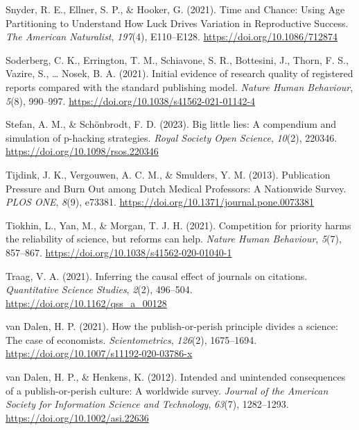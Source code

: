 \documentclass[
  british,
  a4paper,
  ,man,mask,floatsintext]{apa6}
\newlength{\cslhangindent}
\newenvironment{CSLReferences}[2] %
 {\begin{list}{}{%
  \setlength{\itemindent}{0pt}
  \setlength{\leftmargin}{0pt}
  \setlength{\parsep}{0pt}
  \ifodd #1
   \setlength{\leftmargin}{\cslhangindent}
   \setlength{\itemindent}{-1\cslhangindent}
  \fi
  \setlength{\itemsep}{#2\baselineskip}}}
 {\end{list}}
\begin{document}
\begin{CSLReferences}{1}{0}
Snyder, R. E., Ellner, S. P., \& Hooker, G. (2021). Time and {Chance}: {Using Age Partitioning} to {Understand How Luck Drives Variation} in {Reproductive Success}. \emph{The American Naturalist}, \emph{197}(4), E110--E128. \url{https://doi.org/10.1086/712874}

Soderberg, C. K., Errington, T. M., Schiavone, S. R., Bottesini, J., Thorn, F. S., Vazire, S., \ldots{} Nosek, B. A. (2021). Initial evidence of research quality of registered reports compared with the standard publishing model. \emph{Nature Human Behaviour}, \emph{5}(8), 990--997. \url{https://doi.org/10.1038/s41562-021-01142-4}

Stefan, A. M., \& Schönbrodt, F. D. (2023). Big little lies: A compendium and simulation of p-hacking strategies. \emph{Royal Society Open Science}, \emph{10}(2), 220346. \url{https://doi.org/10.1098/rsos.220346}

Tijdink, J. K., Vergouwen, A. C. M., \& Smulders, Y. M. (2013). Publication {Pressure} and {Burn Out} among {Dutch Medical Professors}: {A Nationwide Survey}. \emph{PLOS ONE}, \emph{8}(9), e73381. \url{https://doi.org/10.1371/journal.pone.0073381}

Tiokhin, L., Yan, M., \& Morgan, T. J. H. (2021). Competition for priority harms the reliability of science, but reforms can help. \emph{Nature Human Behaviour}, \emph{5}(7), 857--867. \url{https://doi.org/10.1038/s41562-020-01040-1}

Traag, V. A. (2021). Inferring the causal effect of journals on citations. \emph{Quantitative Science Studies}, \emph{2}(2), 496--504. \url{https://doi.org/10.1162/qss_a_00128}

van Dalen, H. P. (2021). How the publish-or-perish principle divides a science: The case of economists. \emph{Scientometrics}, \emph{126}(2), 1675--1694. \url{https://doi.org/10.1007/s11192-020-03786-x}

van Dalen, H. P., \& Henkens, K. (2012). Intended and unintended consequences of a publish-or-perish culture: {A} worldwide survey. \emph{Journal of the American Society for Information Science and Technology}, \emph{63}(7), 1282--1293. \url{https://doi.org/10.1002/asi.22636}


\end{CSLReferences}
\end{document}
